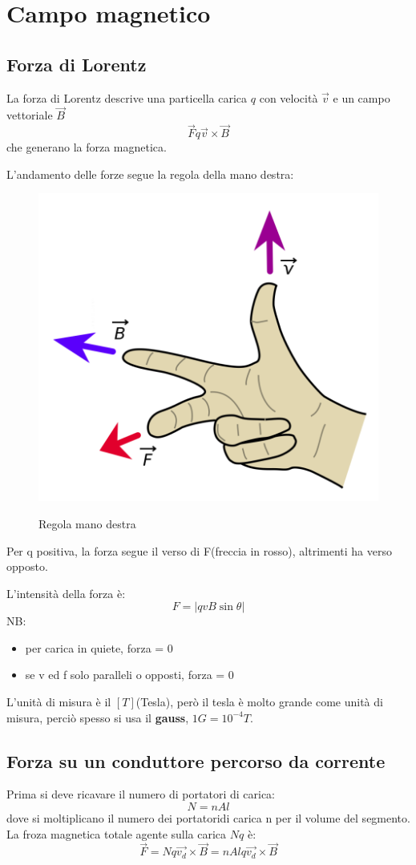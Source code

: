 \section{Campo magnetico}

\subsection{Forza di Lorentz}
La forza di Lorentz descrive una particella carica $q$ con velocità
$\vec{v}$ e un campo vettoriale $\vec{B}$
\begin{equation}
    \vec{F} q\vec{v}\times\vec{B}
\end{equation}
che generano la forza magnetica.

L'andamento delle forze segue la regola della mano destra:
\begin{figure}[H]
    \centering
    \includegraphics[width=0.2\linewidth]{imgs/12 - lorentz.png}
    \label{fig:regola_mano_destra}
    \caption{Regola mano destra}
\end{figure}

Per q positiva, la forza segue il verso di F(freccia in rosso), altrimenti ha verso opposto.

L'intensità della forza è:
\begin{equation}
    F = |qvB\sin\theta|
\end{equation}
NB:
\begin{itemize}
    \item per carica in quiete, forza = 0
    \item se v ed f solo paralleli o opposti, forza = 0
\end{itemize}

L'unità di misura è il $[T]$(Tesla), però il tesla è molto grande come unità 
di misura, perciò spesso si usa il \textbf{gauss},
$1G = 10^{-4}T$.

\subsection{Forza su un conduttore percorso da corrente}
Prima si deve ricavare il numero di portatori di carica:
\begin{equation*}
    N = nAl
\end{equation*}
dove si moltiplicano il numero dei portatoridi carica n per il volume del segmento.
La froza magnetica totale agente sulla carica $Nq$ è:
\begin{equation}
    \vec{F} = Nq\vec{v_d}\times\vec{B} = nAlq\vec{v_d}\times\vec{B}
\end{equation}

